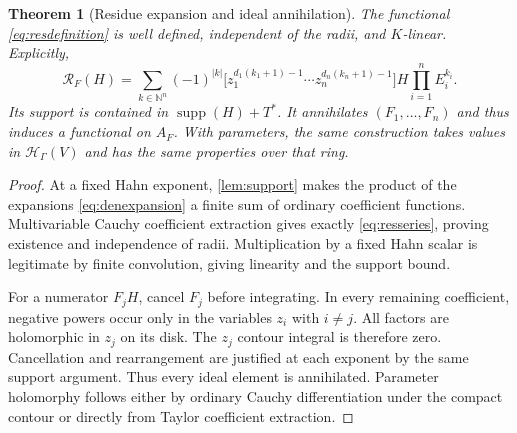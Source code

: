 \documentclass[11pt,letterpaper]{article}
\newtheorem{theorem}{Theorem}[section]
\theoremstyle{definition}
\theoremstyle{remark}
\newcommand{\N}{\mathbb N}
\newcommand{\HH}{\mathcal H}
\newcommand{\RR}{\mathscr R}
\newcommand{\supp}{\operatorname{supp}}
\numberwithin{equation}{section}
\begin{document}
\begin{theorem}[Residue expansion and ideal annihilation]\label{thm:residueformula}
The functional \eqref{eq:resdefinition} is well defined, independent of the radii, and $K$-linear. Explicitly,
\begin{equation}\label{eq:resseries}
 \RR_F(H)=\sum_{k\in\N^n}(-1)^{|k|}
 \bigl[z_1^{d_1(k_1+1)-1}\cdots z_n^{d_n(k_n+1)-1}\bigr]
 H\prod_{i=1}^nE_i^{k_i}.
\end{equation}
Its support is contained in $\supp(H)+T^*$. It annihilates $(F_1,\ldots,F_n)$ and thus induces a functional on $A_F$. With parameters, the same construction takes values in $\HH_\Gamma(V)$ and has the same properties over that ring.
\end{theorem}
\begin{proof}
At a fixed Hahn exponent, \cref{lem:support} makes the product of the expansions \eqref{eq:denexpansion} a finite sum of ordinary coefficient functions. Multivariable Cauchy coefficient extraction gives exactly \eqref{eq:resseries}, proving existence and independence of radii. Multiplication by a fixed Hahn scalar is legitimate by finite convolution, giving linearity and the support bound.

For a numerator $F_jH$, cancel $F_j$ before integrating. In every remaining coefficient, negative powers occur only in the variables $z_i$ with $i\ne j$. All factors are holomorphic in $z_j$ on its disk. The $z_j$ contour integral is therefore zero. Cancellation and rearrangement are justified at each exponent by the same support argument. Thus every ideal element is annihilated. Parameter holomorphy follows either by ordinary Cauchy differentiation under the compact contour or directly from Taylor coefficient extraction.
\end{proof}
\end{document}

